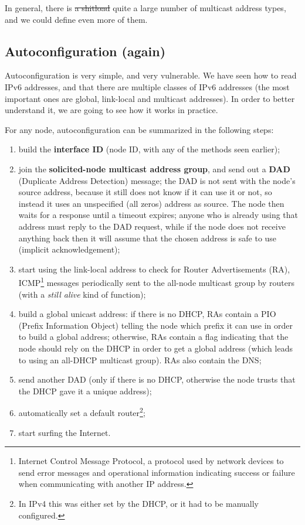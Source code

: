 In general, there is \sout{a shitload} quite a large number of multicast address types, and we could define even more of them.


\subsection{Autoconfiguration (again)}
Autoconfiguration is very simple, and very vulnerable. We have seen how to read IPv6 addresses, and that there are multiple classes of IPv6 addresses (the most important ones are global, link-local and multicast addresses). In order to better understand it, we are going to see how it works in practice.

For any node, autoconfiguration can be summarized in the following steps:

\begin{enumerate}
    \item build the \textbf{interface ID} (node ID, with any of the methods seen earlier);
    
    \item join the \textbf{solicited-node multicast address group}, and send out a \textbf{DAD} (Duplicate Address Detection) message; the DAD is not sent with the node's source address, because it still does not know if it can use it or not, so instead it uses an unspecified (all zeros) address as source. The node then waits for a response until a timeout expires; anyone who is already using that address must reply to the DAD request, while if the node does not receive anything back then it will assume that the chosen address is safe to use (implicit acknowledgement);
    
    \item start using the link-local address to check for Router Advertisements (RA), ICMP\footnote{Internet Control Message Protocol, a protocol used by network devices to send error messages and operational information indicating success or failure when communicating with another IP address.} messages periodically sent to the all-node multicast group by routers (with a \textit{still alive} kind of function);
    
    \item build a global unicast address: if there is no DHCP, RAs contain a PIO (Prefix Information Object) telling the node which prefix it can use in order to build a global address; otherwise, RAs contain a flag indicating that the node should rely on the DHCP in order to get a global address (which leads to using an all-DHCP multicast group). RAs also contain the DNS;
    
    \item send another DAD (only if there is no DHCP, otherwise the node trusts that the DHCP gave it a unique address);
    
    \item automatically set a default router\footnote{In IPv4 this was either set by the DHCP, or it had to be manually configured.};
    
    \item start surfing the Internet.
\end{enumerate}

